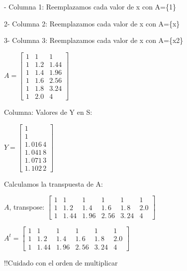 \documentclass{article}
\begin{document}
\bigskip 

\bigskip 

\bigskip 

- Columna 1: Reemplazamos cada valor de x con A=\{1\}

2- Columna 2: Reemplazamos cada valor de x con A=\{x\}

3- Columna 3: Reemplazamos cada valor de x con A=\{x2\}

$A=\left[ 
\begin{array}{ccc}
1 & 1 & 1 \\ 
1 & 1.2 & 1.44 \\ 
1 & 1.4 & 1.96 \\ 
1 & 1.6 & 2.56 \\ 
1 & 1.8 & 3.24 \\ 
1 & 2.0 & 4%
\end{array}%
\right] $

\bigskip Columna: Valores de Y en S:

$Y=\left[ 
\begin{array}{c}
1 \\ 
1 \\ 
1.\,\allowbreak 016\,4 \\ 
1.\,\allowbreak 041\,8 \\ 
1.\,\allowbreak 071\,3 \\ 
1.\,\allowbreak 102\,2%
\end{array}%
\right] $

\bigskip

Calculamos la transpuesta de A:

$A$, transpose: $\left[ 
\begin{array}{cccccc}
1 & 1 & 1 & 1 & 1 & 1 \\ 
1 & 1.\,\allowbreak 2 & 1.\,\allowbreak 4 & 1.\,\allowbreak 6 & 
1.\,\allowbreak 8 & 2.0 \\ 
1 & 1.\,\allowbreak 44 & 1.\,\allowbreak 96 & 2.\,\allowbreak 56 & 
3.\,\allowbreak 24 & 4%
\end{array}%
\right] \allowbreak $

$A^{t}=\left[ 
\begin{array}{cccccc}
1 & 1 & 1 & 1 & 1 & 1 \\ 
1 & 1.\,\allowbreak 2 & 1.\,\allowbreak 4 & 1.\,\allowbreak 6 & 
1.\,\allowbreak 8 & 2.0 \\ 
1 & 1.\,\allowbreak 44 & 1.\,\allowbreak 96 & 2.\,\allowbreak 56 & 
3.\,\allowbreak 24 & 4%
\end{array}%
\right] $

!!Cuidado con el orden de multiplicar
\end{document}
